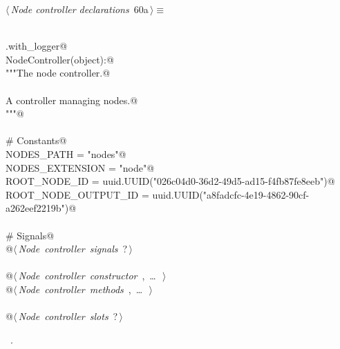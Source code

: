 \documentclass[
    a4paper,      %
    10pt,         %
    openright,    %
    notitlepage,  %
    parskip=half, %
]{scrreprt}       %
\theoremstyle{definition}                    %
\begin{document}
\begin{flushleft} \small
\begin{minipage}{\linewidth}\label{scrap97}\raggedright\small
{} $\langle\,${\itshape Node controller declarations}\nobreak\ {\footnotesize {60a}}$\,\rangle\equiv$
\vspace{-1exm}
\begin{list}{}{} \item
\mbox{}\lstinline@@\\
\mbox{}\lstinline@common.with_logger@\\
\mbox{}\lstinline@class NodeController(object):@\\
\mbox{}\lstinline@    """The node controller.@\\
\mbox{}\lstinline@@\\
\mbox{}\lstinline@    A controller managing nodes.@\\
\mbox{}\lstinline@    """@\\
\mbox{}\lstinline@@\\
\mbox{}\lstinline@    # Constants@\\
\mbox{}\lstinline@    NODES_PATH = "nodes"@\\
\mbox{}\lstinline@    NODES_EXTENSION = "node"@\\
\mbox{}\lstinline@    ROOT_NODE_ID = uuid.UUID("026c04d0-36d2-49d5-ad15-f4fb87fe8eeb")@\\
\mbox{}\lstinline@    ROOT_NODE_OUTPUT_ID = uuid.UUID("a8fadcfc-4e19-4862-90cf-a262eef2219b")@\\
\mbox{}\lstinline@@\\
\mbox{}\lstinline@    # Signals@\\
\mbox{}\lstinline@    @\hbox{$\langle\,${\itshape Node controller signals}\nobreak\ {\footnotesize ?}$\,\rangle$}\lstinline@@\\
\mbox{}\lstinline@@\\
\mbox{}\lstinline@    @\hbox{$\langle\,${\itshape Node controller constructor}\nobreak\ {\footnotesize {}, \ldots\ }$\,\rangle$}\lstinline@@\\
\mbox{}\lstinline@    @\hbox{$\langle\,${\itshape Node controller methods}\nobreak\ {\footnotesize {}, \ldots\ }$\,\rangle$}\lstinline@@\\
\mbox{}\lstinline@@\\
\mbox{}\lstinline@    @\hbox{$\langle\,${\itshape Node controller slots}\nobreak\ {\footnotesize ?}$\,\rangle$}\lstinline@@\\
\mbox{}\lstinline@@{\NWsep}
\end{list}
\vspace{-1.5ex}
\footnotesize
\begin{list}{}{\setlength{\itemsep}{-\parsep}\setlength{\itemindent}{-\leftmargin}}
\item \NWtxtMacroRefIn\ .

\item{}
\end{list}
\end{minipage}\vspace{4ex}
\end{flushleft}
\end{document}
